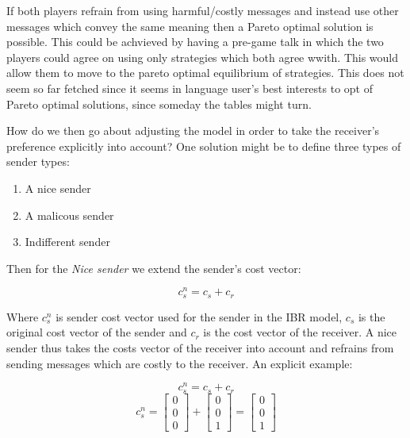 \documentclass[10]{article}
\begin{document}
If both players refrain from using harmful/costly messages and instead use other messages which convey the same meaning then a Pareto optimal solution is possible. This could be achvieved by having a pre-game talk in which the two players could agree on using only strategies which both agree wwith. This would allow them to move to the pareto optimal equilibrium of strategies. This does not seem so far fetched since it seems in language user's best interests to opt of Pareto optimal solutions, since someday the tables might turn.

How do we then go about adjusting the model in order to take the receiver's preference explicitly into account? One solution might be to define three types of sender types: \\

\begin{enumerate}
\item A nice sender
\item A malicous sender
\item Indifferent sender
\end{enumerate}

Then for the \textit{Nice sender} we extend the sender's cost vector:

\begin{equation*}
c_s^n= c_s + c_r
\end{equation*}

Where $c_s^n$ is sender cost vector used for the sender in the IBR model, $c_s$ is the original cost vector of the sender and $c_r$ is the cost vector of the receiver. A nice sender thus takes the costs vector of the receiver into account and refrains from sending messages which are costly to the receiver. An explicit example:

\begin{equation*}
c_s^n= c_s + c_r
\end{equation*}
\begin{equation*}
c_s^n=
\begin{bmatrix}
0 \\
0 \\
0
\end{bmatrix}
+
\begin{bmatrix}
0 \\
0 \\
1
\end{bmatrix}
=
\begin{bmatrix}
0 \\
0 \\
1
\end{bmatrix}
\end{equation*}
\end{document}
